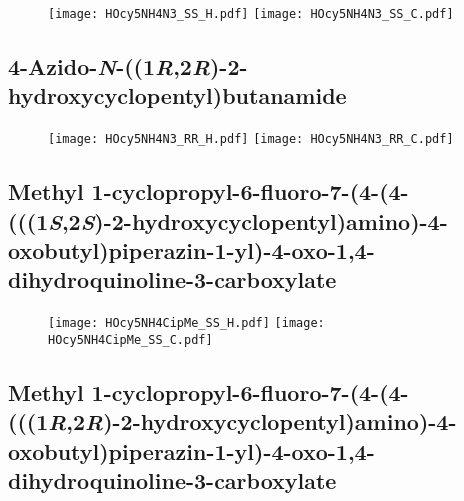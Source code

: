 \begin{figure}[H]
	\centering
		\texttt{[image: HOcy5NH4N3\_SS\_H.pdf]}
		\texttt{[image: HOcy5NH4N3\_SS\_C.pdf]}
\end{figure}

\subsection{4\hyp{}Azido\hyp{}\textit{N}\hyp{}((1\textit{R},2\textit{R})\hyp{}2\hyp{}hydroxycyclopentyl)butanamide } 

\begin{figure}[H]
	\centering
		\texttt{[image: HOcy5NH4N3\_RR\_H.pdf]}
		\texttt{[image: HOcy5NH4N3\_RR\_C.pdf]}
\end{figure}

\subsection{Methyl 1\hyp{}cyclopropyl\hyp{}6\hyp{}fluoro\hyp{}7\hyp{}(4\hyp{}(4\hyp{}(((1\textit{S},2\textit{S})\hyp{}2\hyp{}hydroxycyclopentyl)amino)\hyp{}4\hyp{}oxobutyl)piperazin\hyp{}1\hyp{}yl)\hyp{}4\hyp{}oxo\hyp{}1,4\hyp{}dihydroquinoline\hyp{}3\hyp{}carboxylate }

\begin{figure}[H]
	\centering
		\texttt{[image: HOcy5NH4CipMe\_SS\_H.pdf]}
		\texttt{[image: HOcy5NH4CipMe\_SS\_C.pdf]}
\end{figure}

\subsection{Methyl 1\hyp{}cyclopropyl\hyp{}6\hyp{}fluoro\hyp{}7\hyp{}(4\hyp{}(4\hyp{}(((1\textit{R},2\textit{R})\hyp{}2\hyp{}hydroxycyclopentyl)amino)\hyp{}4\hyp{}oxobutyl)piperazin\hyp{}1\hyp{}yl)\hyp{}4\hyp{}oxo\hyp{}1,4\hyp{}dihydroquinoline\hyp{}3\hyp{}carboxylate }

